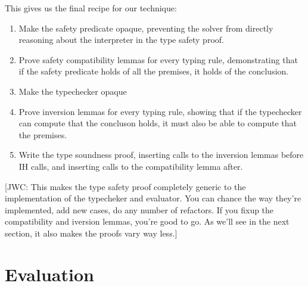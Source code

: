 \documentclass[sigplan,review,screen,anonymous]{acmart}
\newcommand{\comm}[3]{\textcolor{#1}{[#2: #3]}}
\newcommand{\jwc}[1]{\comm{dkgreen}{JWC}{#1}}
\begin{document}
This gives us the final recipe for our technique:

\begin{enumerate}
  \item Make the safety predicate opaque, preventing the solver from directly reasoning about the interpreter in the type safety proof.
  \item Prove safety compatibility lemmas for every typing rule, demonstrating that if the safety predicate holds of all the premises, it holds of the conclusion.
  \item Make the typechecker opaque
  \item Prove inversion lemmas for every typing rule, showing that if the typechecker can compute that the concluson holds, it must also be able to compute that the premises.
  \item Write the type soundness proof, inserting calls to the inversion lemmas before IH calls, and inserting calls to the compatibility lemma after.
\end{enumerate}

\jwc{This makes the type safety proof completely generic to the implementation
of the typecheker and evaluator. You can chance the way they're implemented, add
new cases, do any number of refactors. If you fixup the compatibility and
iversion lemmas, you're good to go. As we'll see in the next section, it also
makes the proofs vary way less.}








\section{Evaluation}
\label{sec:eval}
\end{document}
